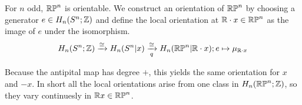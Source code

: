 \documentclass[a4paper,11pt,english]{article}
\begin{document}
\begin{exmp}
For $n$ odd, $\mathbb{RP}^n$ is orientable. We construct an orientation of $\mathbb{RP}^n$ by
choosing a generator $e \in H_n(S^n; \mathbb{Z})$ and define the local orientation at
$\mathbb{R} \cdot x \in \mathbb{RP}^n$  as the image of $e$ under the isomorphism.
\[ H_n(S^n; \mathbb{Z}) \xrightarrow{\cong} H_n(S^n|x) \xrightarrow[q]{\cong} H_n(\mathbb{RP}^n| \mathbb{R}\cdot x);
e \mapsto \mu_{\mathbb{R}\cdot x} \]

Because the antipital map has degree $+$, this yields the same orientation for
$x$ and $-x$. In short all the local orientations arise from one class in
$H_n(\mathbb{RP}^n;\mathbb{Z})$, so they vary continuesly in $\mathbb{R} x \in \mathbb{RP}^n$.
\end{exmp}
\end{document}
